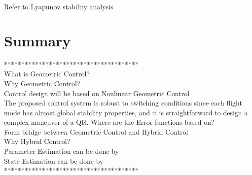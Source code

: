 Refer to Lyapunov stability analysis \cite{Bullo2005}

\section{Summary}

***************************************\\
What is Geometric Control?\\
Why Geometric Control?\\
Control design will be based on Nonlinear Geometric Control\\

The proposed control system is robust to switching conditions since each flight mode has almost global stability properties, and it is straightforward to design a complex maneuver of a QR. \cite{Lee2010c}
Where are the Error functions based on?\\

Form bridge between Geometric Control and Hybrid Control\\
Why Hybrid Control?\\

Parameter Estimation can be done by\\
State Estimation can be done by\\

***************************************\\
